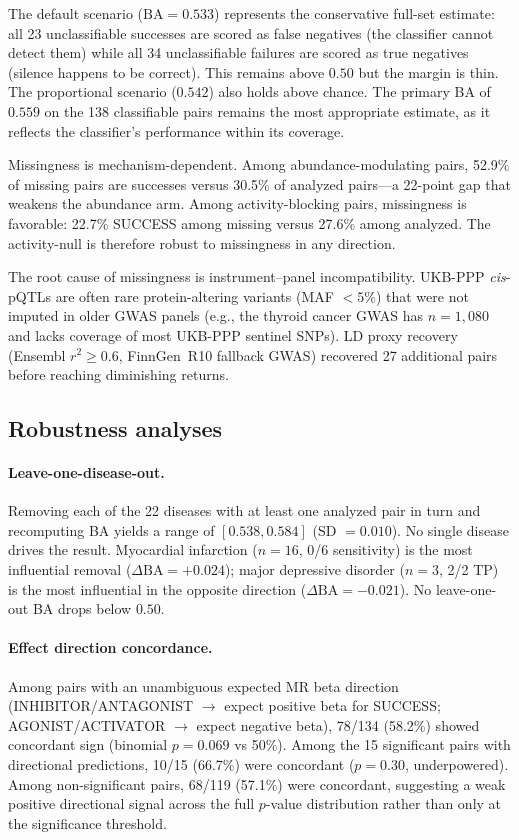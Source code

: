 \documentclass[11pt]{article}
\begin{document}
The default scenario ($\text{BA} = 0.533$) represents the conservative full-set estimate: all 23 unclassifiable successes are scored as false negatives (the classifier cannot detect them) while all 34 unclassifiable failures are scored as true negatives (silence happens to be correct). This remains above $0.50$ but the margin is thin. The proportional scenario ($0.542$) also holds above chance. The primary BA of $0.559$ on the 138 classifiable pairs remains the most appropriate estimate, as it reflects the classifier's performance within its coverage.

Missingness is mechanism-dependent. Among abundance-modulating pairs, 52.9\% of missing pairs are successes versus 30.5\% of analyzed pairs---a 22-point gap that weakens the abundance arm. Among activity-blocking pairs, missingness is favorable: 22.7\% SUCCESS among missing versus 27.6\% among analyzed. The activity-null is therefore robust to missingness in any direction.

The root cause of missingness is instrument--panel incompatibility. UKB-PPP \emph{cis}-pQTLs are often rare protein-altering variants (MAF $< 5\%$) that were not imputed in older GWAS panels (e.g., the thyroid cancer GWAS has $n = 1{,}080$ and lacks coverage of most UKB-PPP sentinel SNPs). LD proxy recovery (Ensembl $r^2 \geq 0.6$, FinnGen~R10 fallback GWAS) recovered 27 additional pairs before reaching diminishing returns.

\subsection{Robustness analyses}
\label{sec:robustness}

\paragraph{Leave-one-disease-out.}
Removing each of the 22 diseases with at least one analyzed pair in turn and recomputing BA yields a range of $[0.538, 0.584]$ (SD $= 0.010$). No single disease drives the result. Myocardial infarction ($n = 16$, 0/6 sensitivity) is the most influential removal ($\Delta\text{BA} = +0.024$); major depressive disorder ($n = 3$, 2/2 TP) is the most influential in the opposite direction ($\Delta\text{BA} = -0.021$). No leave-one-out BA drops below $0.50$.

\paragraph{Effect direction concordance.}
Among pairs with an unambiguous expected MR beta direction (INHIBITOR/ANTAGONIST $\rightarrow$ expect positive beta for SUCCESS; AGONIST/ACTIVATOR $\rightarrow$ expect negative beta), 78/134 (58.2\%) showed concordant sign (binomial $p = 0.069$ vs 50\%). Among the 15 significant pairs with directional predictions, 10/15 (66.7\%) were concordant ($p = 0.30$, underpowered). Among non-significant pairs, 68/119 (57.1\%) were concordant, suggesting a weak positive directional signal across the full $p$-value distribution rather than only at the significance threshold.
\end{document}
